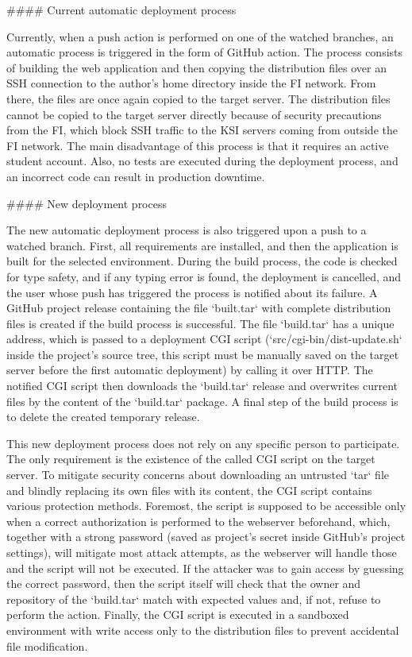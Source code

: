 \documentclass[
  digital, %
  oneside, %
  lof,     %
  nolot,     %
]{fithesis4}
\begin{document}
{#### Current automatic deployment process

Currently, when a push action is performed on one of the watched branches, an automatic process is triggered in the form of GitHub action. The process consists of building the web application and then copying the distribution files over an \acrshort{SSH} connection to the author's home directory inside the \acrshort{FI} network. From there, the files are once again copied to the target server. The distribution files cannot be copied to the target server directly because of security precautions from the \acrshort{FI}, which block \acrshort{SSH} traffic to the \acrshort{KSI} servers coming from outside the \acrshort{FI} network. The main disadvantage of this process is that it requires an active student account. Also, no tests are executed during the deployment process, and an incorrect code can result in production downtime.

#### New deployment process

The new automatic deployment process is also triggered upon a push to a watched branch. First, all requirements are installed, and then the application is built for the selected environment. During the build process, the code is checked for type safety, and if any typing error is found, the deployment is cancelled, and the user whose push has triggered the process is notified about its failure. A GitHub project release containing the file `built.tar` with complete distribution files is created if the build process is successful. The file `build.tar` has a unique address, which is passed to a deployment \acrshort{CGI} script (`src/cgi-bin/dist-update.sh` inside the project's source tree, this script must be manually saved on the target server before the first automatic deployment) by calling it over \acrshort{HTTP}. The notified \acrshort{CGI} script then downloads the `build.tar` release and overwrites current files by the content of the `build.tar` package. A final step of the build process is to delete the created temporary release.

This new deployment process does not rely on any specific person to participate. The only requirement is the existence of the called \acrshort{CGI} script on the target server. To mitigate security concerns about downloading an untrusted `tar` file and blindly replacing its own files with its content, the \acrshort{CGI} script contains various protection methods. Foremost, the script is supposed to be accessible only when a correct authorization is performed to the webserver beforehand, which, together with a strong password (saved as project's secret inside GitHub's project settings), will mitigate most attack attempts, as the webserver will handle those and the script will not be executed. If the attacker was to gain access by guessing the correct password, then the script itself will check that the owner and repository of the `build.tar` match with expected values and, if not, refuse to perform the action. Finally, the \acrshort{CGI} script is executed in a sandboxed environment with write access only to the distribution files to prevent accidental file modification.

}
\end{document}
